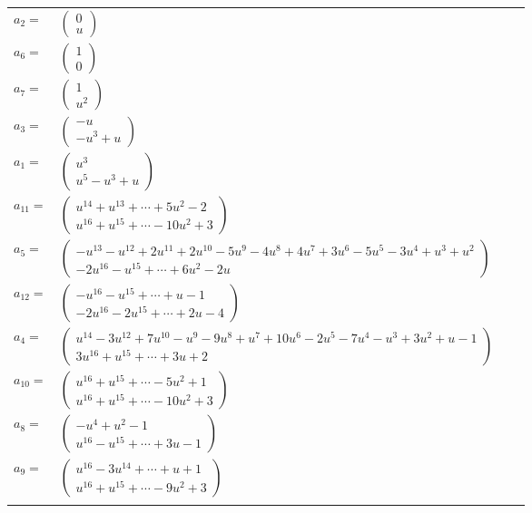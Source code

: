 \documentclass[1p]{elsarticle_modified}
\theoremstyle{definition}
\begin{document}
\begin{tabular}{m{7pt} m{180pt} m{7pt} m{180pt} }
\flushright $a_{2}=$&$\begin{pmatrix}0\\u\end{pmatrix}$ \\
\flushright $a_{6}=$&$\begin{pmatrix}1\\0\end{pmatrix}$ \\
\flushright $a_{7}=$&$\begin{pmatrix}1\\u^2\end{pmatrix}$ \\
\flushright $a_{3}=$&$\begin{pmatrix}- u\\- u^3+u\end{pmatrix}$ \\
\flushright $a_{1}=$&$\begin{pmatrix}u^3\\u^5- u^3+u\end{pmatrix}$ \\
\flushright $a_{11}=$&$\begin{pmatrix}u^{14}+u^{13}+\cdots+5 u^2-2\\u^{16}+u^{15}+\cdots-10 u^2+3\end{pmatrix}$ \\
\flushright $a_{5}=$&$\begin{pmatrix}- u^{13}- u^{12}+2 u^{11}+2 u^{10}-5 u^9-4 u^8+4 u^7+3 u^6-5 u^5-3 u^4+u^3+u^2\\-2 u^{16}- u^{15}+\cdots+6 u^2-2 u\end{pmatrix}$ \\
\flushright $a_{12}=$&$\begin{pmatrix}- u^{16}- u^{15}+\cdots+u-1\\-2 u^{16}-2 u^{15}+\cdots+2 u-4\end{pmatrix}$ \\
\flushright $a_{4}=$&$\begin{pmatrix}u^{14}-3 u^{12}+7 u^{10}- u^9-9 u^8+u^7+10 u^6-2 u^5-7 u^4- u^3+3 u^2+u-1\\3 u^{16}+u^{15}+\cdots+3 u+2\end{pmatrix}$ \\
\flushright $a_{10}=$&$\begin{pmatrix}u^{16}+u^{15}+\cdots-5 u^2+1\\u^{16}+u^{15}+\cdots-10 u^2+3\end{pmatrix}$ \\
\flushright $a_{8}=$&$\begin{pmatrix}- u^4+u^2-1\\u^{16}- u^{15}+\cdots+3 u-1\end{pmatrix}$ \\
\flushright $a_{9}=$&$\begin{pmatrix}u^{16}-3 u^{14}+\cdots+u+1\\u^{16}+u^{15}+\cdots-9 u^2+3\end{pmatrix}$\\&\end{tabular}
\end{document}
